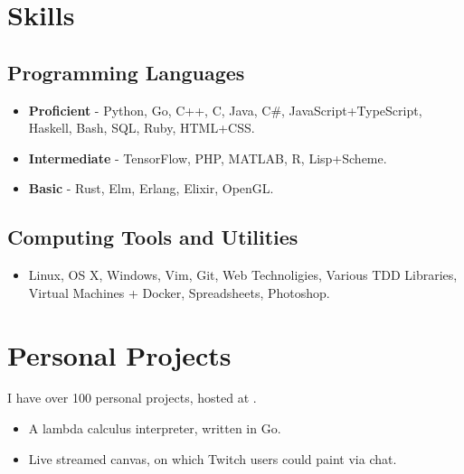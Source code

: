 \documentclass{jcgcv}
\begin{document}
\begin{column}



\section{Skills}

\subsection{Programming Languages}
\begin{itemize}
  \item \textbf{Proficient} - Python, Go, C++, C, Java, C\#, JavaScript+TypeScript, Haskell, Bash, SQL, Ruby, HTML+CSS.
  \item \textbf{Intermediate} - TensorFlow, PHP, MATLAB, R, Lisp+Scheme.
  \item \textbf{Basic} - Rust, Elm, Erlang, Elixir, OpenGL.
\end{itemize}

\subsection{Computing Tools and Utilities}
\begin{itemize}
  \item Linux, OS X, Windows, Vim, Git, Web Technoligies, Various TDD Libraries, Virtual Machines + Docker, Spreadsheets, Photoshop.
\end{itemize}



\section{Personal Projects}

I have over 100 personal projects, hosted at .

\vspace{2pt}

\begin{itemize}
  \item A lambda calculus interpreter, written in Go.
\end{itemize}

\begin{itemize}
  \item Live streamed canvas, on which Twitch users could paint via chat.
\end{itemize}


\end{column}
\end{document}
